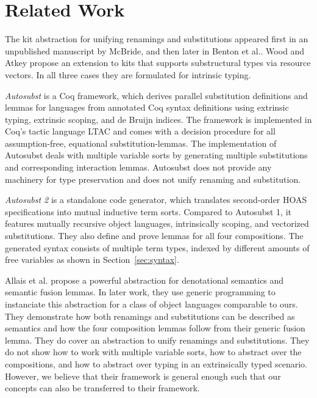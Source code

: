 \documentclass[sigplan,10pt, anonymous]{acmart}
\begin{document}
  \section{Related Work}
  \label{sec:related}

  The kit abstraction for unifying renamings and substitutions
  appeared first in an unpublished manuscript by
  McBride\cite{unpublished:mcbride2005kits}, and then later in
  Benton et al.\cite{DBLP:journals/jar/BentonHKM12}. 
  Wood and Atkey\cite{DBLP:journals/corr/abs-2005-02247} propose an
  extension to kits that supports substructural types via resource
  vectors.
  In all three cases they are formulated for intrinsic typing.

  \emph{Autosubst}\cite{DBLP:conf/itp/SchaferTS15}
  is a Coq framework, which derives parallel substitution definitions and
  lemmas for languages from annotated Coq syntax definitions using
  extrinsic typing, extrinsic scoping, and de Bruijn indices.
  The framework is implemented in Coq's tactic language LTAC and comes
  with a decision procedure for all assumption-free, equational
  substitution-lemmas.
  The implementation of Autosubst deals with multiple variable sorts
  by generating multiple substitutions and corresponding interaction lemmas.
  Autosubst does not provide any machinery for type preservation and
  does not unify renaming and substitution.

  \emph{Autosubst 2}\cite{DBLP:conf/cpp/StarkSK19} is a standalone
  code generator, which translates second-order HOAS specifications into
  mutual inductive term sorts. Compared to Autosubst 1, it features
  mutually recursive object languages, intrinsically scoping, and
  vectorized substitutions.
  They also define and prove lemmas for all four compositions.
  The generated syntax consists of multiple term types, indexed by
  different amounts of free variables as shown in Section~\ref{sec:syntax}.

  Allais et al.\cite{DBLP:conf/cpp/Allais0MM17} propose a powerful
  abstraction for denotational semantics and semantic fusion lemmas.
  In later work\cite{DBLP:journals/pacmpl/AllaisA0MM18}, they use
  generic programming to instanciate this abstraction for a class of
  object languages comparable to ours.
  They demonstrate how both renamings and substitutions can be
  described as semantics and how the four composition lemmas follow from
  their generic fusion lemma.
  They do cover an abstraction to unify renamings and substitutions.
  They do not show how to work with multiple variable sorts, how to
  abstract over the compositions, and how to abstract over typing in
  an extrinsically typed scenario.
  However, we believe that their framework is general enough such that
  our concepts can also be transferred to their framework.
\end{document}
